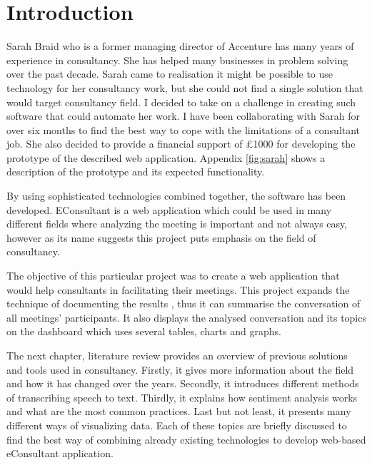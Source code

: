 \documentclass{article}
\begin{document}
\section{Introduction}
{\large 
Sarah Braid who is a former managing director of Accenture has many years of experience in consultancy. She has helped many businesses in problem solving over the past decade. Sarah came to realisation it might be possible to use technology for her consultancy work, but she could not find a single solution that would target consultancy field. I decided to take on a challenge in creating such software that could automate her work. I have been collaborating with Sarah for over six months to find the best way to cope with the limitations of a consultant job. She also decided to provide a financial support of £1000 for developing the prototype of the described web application. Appendix \ref{fig:sarah} shows a description of the prototype and its expected functionality.\par
}

{\large
By using sophisticated technologies combined together, the software has been developed. EConsultant is a web application which could be used in many different fields where analyzing the meeting is important and not always easy, however as its name suggests this project puts emphasis on the field of consultancy.\par
}

{\large 
The objective of this particular project was to create a web application that would help consultants in facilitating their meetings. This project expands the technique of documenting the results \parencite{facilitateclients}, thus it can summarise the conversation of all meetings' participants. It also displays the analysed conversation and its topics on the dashboard which uses several tables, charts and graphs.\par
}

{\large 
The next chapter, literature review provides an overview of previous solutions and tools used in consultancy. Firstly, it gives more information about the field and how it has changed over the years. Secondly, it introduces different methods of transcribing speech to text. Thirdly, it explains how sentiment analysis works and what are the most common practices. Last but not least, it presents many different ways of visualizing data. Each of these topics are briefly discussed to find the best way of combining already existing technologies to develop web-based eConsultant application.\par
}
 
\end{document}
